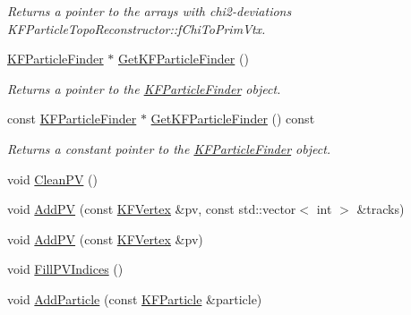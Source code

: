 \begin{DoxyCompactItemize}
\begin{DoxyCompactList}\small\item\em Returns a pointer to the arrays with chi2-\/deviations K\+F\+Particle\+Topo\+Reconstructor\+::f\+Chi\+To\+Prim\+Vtx. \end{DoxyCompactList}\item 
\hyperlink{classKFParticleFinder}{K\+F\+Particle\+Finder} $\ast$ \hyperlink{classKFParticleTopoReconstructor_afdc38e3ac2b743b0ca27e68b8033cadc}{Get\+K\+F\+Particle\+Finder} ()\hypertarget{classKFParticleTopoReconstructor_afdc38e3ac2b743b0ca27e68b8033cadc}{}\label{classKFParticleTopoReconstructor_afdc38e3ac2b743b0ca27e68b8033cadc}

\begin{DoxyCompactList}\small\item\em Returns a pointer to the \hyperlink{classKFParticleFinder}{K\+F\+Particle\+Finder} object. \end{DoxyCompactList}\item 
const \hyperlink{classKFParticleFinder}{K\+F\+Particle\+Finder} $\ast$ \hyperlink{classKFParticleTopoReconstructor_af24a8d9bf6b0ad4255ba821e3d0f3e69}{Get\+K\+F\+Particle\+Finder} () const \hypertarget{classKFParticleTopoReconstructor_af24a8d9bf6b0ad4255ba821e3d0f3e69}{}\label{classKFParticleTopoReconstructor_af24a8d9bf6b0ad4255ba821e3d0f3e69}

\begin{DoxyCompactList}\small\item\em Returns a constant pointer to the \hyperlink{classKFParticleFinder}{K\+F\+Particle\+Finder} object. \end{DoxyCompactList}\item 
void \hyperlink{classKFParticleTopoReconstructor_a9224eadff464879560bcef02432ff0fe}{Clean\+PV} ()
\item 
void \hyperlink{classKFParticleTopoReconstructor_a5a65991118f02da331aa69333075cbd1}{Add\+PV} (const \hyperlink{classKFVertex}{K\+F\+Vertex} \&pv, const std\+::vector$<$ int $>$ \&tracks)
\item 
void \hyperlink{classKFParticleTopoReconstructor_accb2af447b4a091da757e6ced058da70}{Add\+PV} (const \hyperlink{classKFVertex}{K\+F\+Vertex} \&pv)
\item 
void \hyperlink{classKFParticleTopoReconstructor_ac5407872313a3867ffcda0e460f706aa}{Fill\+P\+V\+Indices} ()
\item 
void \hyperlink{classKFParticleTopoReconstructor_a639b20e468c895fb6023eb5344582fe3}{Add\+Particle} (const \hyperlink{classKFParticle}{K\+F\+Particle} \&particle)\hypertarget{classKFParticleTopoReconstructor_a639b20e468c895fb6023eb5344582fe3}{}\label{classKFParticleTopoReconstructor_a639b20e468c895fb6023eb5344582fe3}


\end{DoxyCompactItemize}
